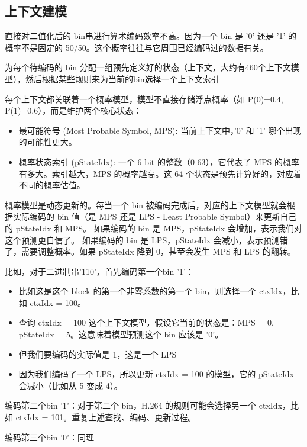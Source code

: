 \documentclass{/Users/hi/Study/template/code}
\begin{document}
\subsection{上下文建模}
直接对二值化后的 bin串进行算术编码效率不高。因为一个 bin 是 '0' 还是 '1' 的概率不是固定的 50/50。这个概率往往与它周围已经编码过的数据有关。

为每个待编码的 bin 分配一组预先定义好的状态（上下文，大约有460个上下文模型），然后根据某些规则来为当前的bin选择一个上下文索引

每个上下文都关联着一个概率模型，模型不直接存储浮点概率（如 P(0)=0.4, P(1)=0.6），而是维护两个核心状态：
\begin{itemize}
	\item 最可能符号 (Most Probable Symbol, MPS): 当前上下文中，'0' 和 '1' 哪个出现的可能性更大。
	\item 概率状态索引 (pStateIdx): 一个 6-bit 的整数（0-63），它代表了 MPS 的概率有多大。索引越大，MPS 的概率越高。这 64 个状态是预先计算好的，对应着不同的概率估值。
\end{itemize}
概率模型是动态更新的。每当一个 bin 被编码完成后，对应的上下文模型就会根据实际编码的 bin 值（是 MPS 还是 LPS - Least Probable Symbol）来更新自己的 pStateIdx 和 MPS。
如果编码的 bin 是 MPS，pStateIdx 会增加，表示我们对这个预测更自信了。
如果编码的 bin 是 LPS，pStateIdx 会减小，表示预测错了，需要调整概率。如果 pStateIdx 降到 0，甚至会发生 MPS 和 LPS 的翻转。

\begin{tcolorbox}
	\small
	比如，对于二进制串'110'，首先编码第一个bin '1'：
	\begin{itemize}
		\item 比如这是这个 block 的第一个非零系数的第一个 bin，则选择一个 ctxIdx，比如 ctxIdx = 100。
		\item 查询 ctxIdx = 100 这个上下文模型，假设它当前的状态是：MPS = 0, pStateIdx = 5。这意味着模型预测这个 bin 应该是 '0'。
		\item 但我们要编码的实际值是 1，这是一个 LPS
		\item 因为我们编码了一个 LPS，所以更新 ctxIdx = 100 的模型，它的 pStateIdx 会减小（比如从 5 变成 4）。
	\end{itemize}

	编码第二个bin '1'：对于第二个 bin，H.264 的规则可能会选择另一个 ctxIdx，比如 ctxIdx = 101。重复上述查找、编码、更新过程。

	编码第三个bin '0'：同理
\end{tcolorbox}
\end{document}
